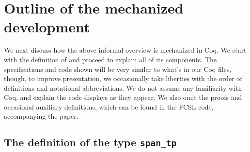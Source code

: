 
\section{Outline of the mechanized development}
\label{sec:devel}

We next discuss how the above informal overview is mechanized in
Coq. We start with the definition of  and proceed to
explain all of its components.
%
%
The specifications and code shown will be very similar to what's in
our Coq files, though, to improve presentation, we occasionally take
liberties with the order of definitions and notational
abbreviations. We do not assume any familiarity with Coq, and explain
the code displays as they appear. We also omit the proofs and
occasional auxiliary definitions, which can be found in the FCSL code,
accompanying the paper.

\subsection{The definition of the type \texttt{span\_tp}}

